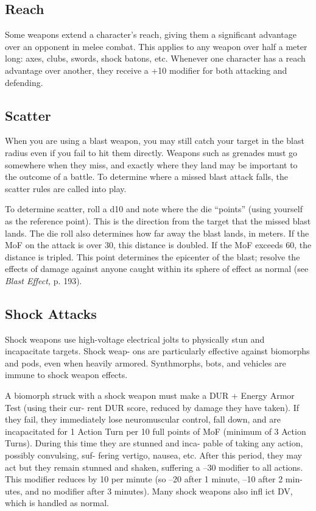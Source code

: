 \subsection{Reach}

Some weapons extend a character's reach, giving 
them a significant advantage over an opponent in 
melee combat. This applies to any weapon over half 
a meter long: axes, clubs, swords, shock batons, etc. 
Whenever one character has a reach advantage over 
another, they receive a +10 modifier for both attacking 
and defending.

\subsection{Scatter}

When you are using a blast weapon, you may still 
catch your target in the blast radius even if you fail to 
hit them directly. Weapons such as grenades must go 
somewhere when they miss, and exactly where they 
land may be important to the outcome of a battle. To 
determine where a missed blast attack falls, the scatter 
rules are called into play.

To determine scatter, roll a d10 and note where the 
die ``points'' (using yourself as the reference point). 
This is the direction from the target that the missed 
blast lands. The die roll also determines how far away 
the blast lands, in meters. If the MoF on the attack is 
over 30, this distance is doubled. If the MoF exceeds 
60, the distance is tripled. This point determines the 
epicenter of the blast; resolve the effects of damage 
against anyone caught within its sphere of effect as 
normal (see \textit{Blast Effect,} p. 193).

\subsection{Shock Attacks}

Shock weapons use high-voltage electrical jolts to 
physically stun and incapacitate targets. Shock weap-
ons are particularly effective against biomorphs and 
pods, even when heavily armored. Synthmorphs, bots, 
and vehicles are immune to shock weapon effects.

A biomorph struck with a shock weapon must 
make a DUR + Energy Armor Test (using their cur-
rent DUR score, reduced by damage they have taken). 
If they fail, they immediately lose neuromuscular 
control, fall down, and are incapacitated for 1 Action 
Turn per 10 full points of MoF (minimum of 3 Action 
Turns). During this time they are stunned and inca-
pable of taking any action, possibly convulsing, suf-
fering vertigo, nausea, etc. After this period, they may 
act but they remain stunned and shaken, suffering a 
–30 modifier to all actions. This modifier reduces by 
10 per minute (so –20 after 1 minute, –10 after 2 min-
utes, and no modifier after 3 minutes). Many shock 
weapons also infl ict DV, which is handled as normal.

